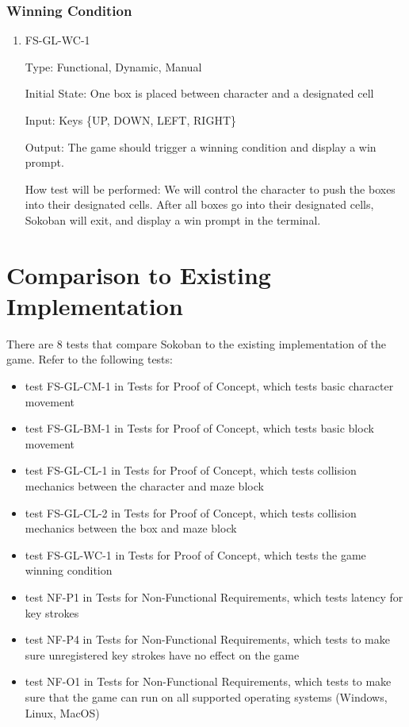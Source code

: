 \documentclass[12pt, titlepage]{article}
\begin{document}
\subsubsection{Winning Condition}

\begin{enumerate}

\item{FS-GL-WC-1\\}

Type: Functional, Dynamic, Manual
					
Initial State: One box is placed between character and a designated cell
					
Input: Keys \{UP, DOWN, LEFT, RIGHT\}
					
Output: The game should trigger a winning condition and display a win prompt. 
					
How test will be performed: We will control the character to push the boxes into their designated cells. After all boxes go into their designated cells, Sokoban will exit, and display a win prompt in the terminal.

\end{enumerate}
	
\section{Comparison to Existing Implementation}	

There are 8 tests that compare Sokoban to the existing implementation of the game. Refer to the following tests:
\begin{itemize}
    \item{test FS-GL-CM-1 in Tests for Proof of Concept, which tests basic character movement}
    \item{test FS-GL-BM-1 in Tests for Proof of Concept, which tests basic block movement}
    \item{test FS-GL-CL-1 in Tests for Proof of Concept, which tests collision mechanics between the character and maze block}
    \item{test FS-GL-CL-2 in Tests for Proof of Concept, which tests collision mechanics between the box and maze block}
    \item{test FS-GL-WC-1 in Tests for Proof of Concept, which tests the game winning condition}
    \item{test NF-P1 in Tests for Non-Functional Requirements, which tests latency for key strokes}
    \item{test NF-P4 in Tests for Non-Functional Requirements, which tests to make sure unregistered key strokes have no effect on the game}
    \item{test NF-O1 in Tests for Non-Functional Requirements, which tests to make sure that the game can run on all supported operating systems (Windows, Linux, MacOS)}
\end{itemize}
				
\end{document}

